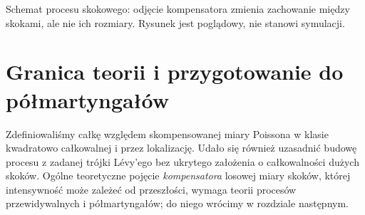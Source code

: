 \begin{center}
\par\smallskip\small Schemat procesu skokowego: odjęcie kompensatora
zmienia zachowanie między skokami, ale nie ich rozmiary.
Rysunek jest poglądowy, nie stanowi symulacji.
\end{center}

\section{Granica teorii i przygotowanie do półmartyngałów}
Zdefiniowaliśmy całkę względem skompensowanej miary
Poissona w klasie kwadratowo całkowalnej i przez lokalizację.
Udało się również uzasadnić budowę procesu z zadanej trójki
Lévy'ego bez ukrytego założenia o całkowalności dużych
skoków. Ogólne teoretyczne pojęcie \emph{kompensatora}
losowej miary skoków, której intensywność może zależeć
od przeszłości, wymaga teorii procesów przewidywalnych
i półmartyngałów; do niego wrócimy w rozdziale następnym.

